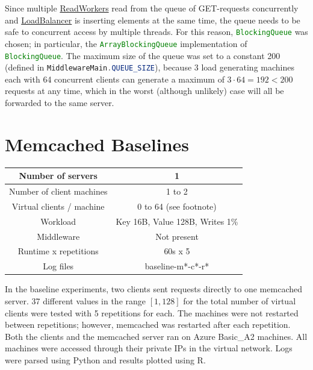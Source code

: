 \documentclass[11pt]{article}
\newcommand{\code}[1]{\lstinline[language=Java]{#1}}
\newcommand{\linkmain}[1]{\href{https://gitlab.inf.ethz.ch/pungast/asl-fall16-project/blob/master/src/main/java/asl/#1.java}{#1}}
\begin{document}
Since multiple \linkmain{ReadWorkers} read from the queue of GET-requests concurrently and \linkmain{LoadBalancer} is inserting elements at the same time, the queue needs to be safe to concurrent access by multiple threads. For this reason, \code{BlockingQueue} was chosen; in particular, the \code{ArrayBlockingQueue} implementation of \code{BlockingQueue}. The maximum size of the queue was set to a constant 200 (defined in \code{MiddlewareMain.QUEUE_SIZE}), because 3 load generating machines each with 64 concurrent clients can generate a maximum of $3 \cdot 64 = 192 < 200$ requests at any time, which in the worst (although unlikely) case will all be forwarded to the same server.


\section{Memcached Baselines}\label{sec:baseline}

\begin{center}
\small{
\smallskip
\begin{tabular}{|c|c|}
\hline Number of servers & 1 \\ 
\hline Number of client machines & 1 to 2 \\ 
\hline Virtual clients / machine & 0 to 64 (see footnote\footnotemark)\\ 
\hline Workload & Key 16B, Value 128B, Writes 1\% \\
\hline Middleware & Not present \\ 
\hline Runtime x repetitions & 60s x 5 \\ 
\hline Log files & baseline-m*-c*-r* \\
\hline 
\end{tabular} }
\end{center}

In the baseline experiments, two clients sent requests directly to one memcached server. 37 different values in the range $[1, 128]$ for the total number of virtual clients were tested with 5 repetitions for each. The machines were not restarted between repetitions; however, memcached was restarted after each repetition. Both the clients and the memcached server ran on Azure Basic\_A2 machines. All machines were accessed through their private IPs in the virtual network. Logs were parsed using Python and results plotted using R.
\end{document}
